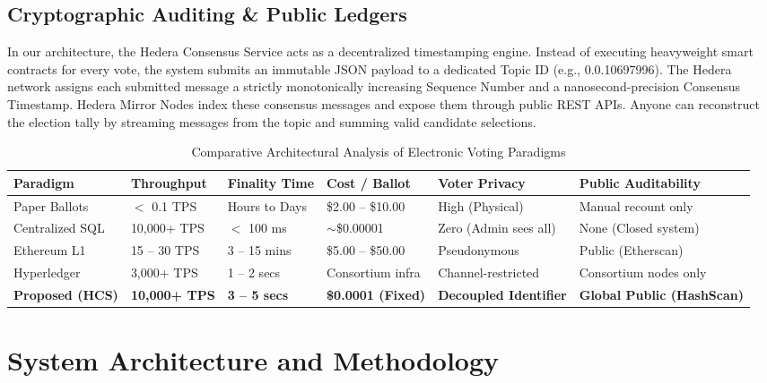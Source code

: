 \documentclass[12pt, a4paper]{article}
\begin{document}
\subsection{Cryptographic Auditing \& Public Ledgers}
In our architecture, the Hedera Consensus Service acts as a decentralized timestamping engine. Instead of executing heavyweight smart contracts for every vote, the system submits an immutable JSON payload to a dedicated Topic ID (e.g., 0.0.10697996). The Hedera network assigns each submitted message a strictly monotonically increasing Sequence Number and a nanosecond-precision Consensus Timestamp. Hedera Mirror Nodes index these consensus messages and expose them through public REST APIs. Anyone can reconstruct the election tally by streaming messages from the topic and summing valid candidate selections.

\begin{table}[H]
    \centering
    \caption{Comparative Architectural Analysis of Electronic Voting Paradigms}
    \label{tab:comparison}
    \begin{tabularx}{\textwidth}{@{}l X l l X X@{}}
        \toprule
        \textbf{Paradigm} & \textbf{Throughput} & \textbf{Finality Time} & \textbf{Cost / Ballot} & \textbf{Voter Privacy} & \textbf{Public Auditability} \\
        \midrule
        Paper Ballots & $<$ 0.1 TPS & Hours to Days & \$2.00 -- \$10.00 & High (Physical) & Manual recount only \\
        Centralized SQL & 10,000+ TPS & $<$ 100 ms & $\sim$\$0.00001 & Zero (Admin sees all) & None (Closed system) \\
        Ethereum L1 & 15 -- 30 TPS & 3 -- 15 mins & \$5.00 -- \$50.00 & Pseudonymous & Public (Etherscan) \\
        Hyperledger & 3,000+ TPS & 1 -- 2 secs & Consortium infra & Channel-restricted & Consortium nodes only \\
        \textbf{Proposed (HCS)} & \textbf{10,000+ TPS} & \textbf{3 -- 5 secs} & \textbf{\$0.0001 (Fixed)} & \textbf{Decoupled Identifier} & \textbf{Global Public (HashScan)} \\
        \bottomrule
    \end{tabularx}
\end{table}

\section{System Architecture and Methodology}
\end{document}
